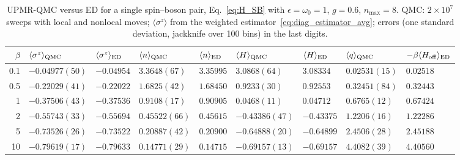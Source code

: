 \begin{table}[t]
\caption{UPMR-QMC versus ED for a single spin--boson pair, Eq.~\eqref{eq:H_SB} with $\epsilon=\omega_0=1$, $g=0.6$, $n_{\max}=8$. QMC: $2\times10^7$ sweeps with local and nonlocal moves; $\langle\sigma^z\rangle$ from the weighted estimator~\eqref{eq:diag_estimator_avg}; errors (one standard deviation, jackknife over 100 bins) in the last digits.}
\label{tab:sb_ed}
\small
\begin{tabular}{r|ll|ll|ll|ll}
\hline\hline
$\beta$ & $\langle\sigma^z\rangle_{\rm QMC}$ & $\langle\sigma^z\rangle_{\rm ED}$ & $\langle n\rangle_{\rm QMC}$ & $\langle n\rangle_{\rm ED}$ & $\langle H\rangle_{\rm QMC}$ & $\langle H\rangle_{\rm ED}$ & $\langle q\rangle_{\rm QMC}$ & $-\beta\langle H_{\rm off}\rangle_{\rm ED}$\\
\hline
0.1 & $-0.04977(50)$ & $-0.04954$ & $3.3648(67)$ & $3.35995$ & $3.0868(64)$ & $3.08334$ & $0.02531(15)$ & $0.02518$ \\
0.5 & $-0.22029(41)$ & $-0.22022$ & $1.6825(42)$ & $1.68450$ & $0.9233(30)$ & $0.92553$ & $0.32451(84)$ & $0.32443$ \\
1 & $-0.37506(43)$ & $-0.37536$ & $0.9108(17)$ & $0.90905$ & $0.0468(11)$ & $0.04712$ & $0.6765(12)$ & $0.67424$ \\
2 & $-0.55743(33)$ & $-0.55694$ & $0.45522(66)$ & $0.45615$ & $-0.43386(47)$ & $-0.43375$ & $1.2206(16)$ & $1.22286$ \\
5 & $-0.73526(26)$ & $-0.73522$ & $0.20887(42)$ & $0.20900$ & $-0.64888(20)$ & $-0.64899$ & $2.4506(28)$ & $2.45188$ \\
10 & $-0.79619(17)$ & $-0.79633$ & $0.14771(29)$ & $0.14715$ & $-0.69157(13)$ & $-0.69157$ & $4.4082(39)$ & $4.40560$ \\
\hline\hline
\end{tabular}
\end{table}

